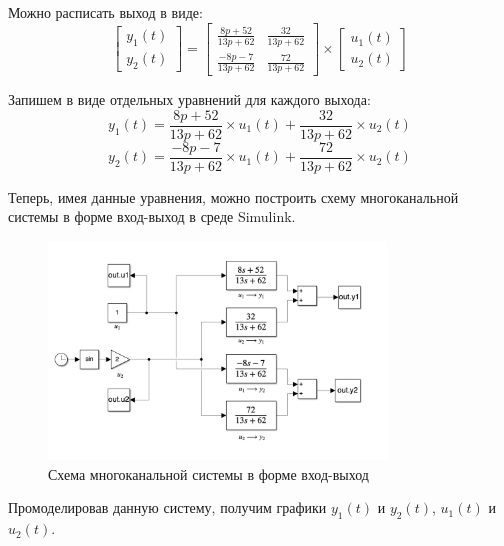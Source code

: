 Можно расписать выход в виде:
\begin{equation}
    \begin{bmatrix} 
        y_1(t)\\
        y_2(t)
    \end{bmatrix}
     = \begin{bmatrix}
        \frac{8p+52}{13p+62} & \frac{32}{13p+62} \\
        \frac{-8p-7}{13p+62} & \frac{72}{13p+62}
    \end{bmatrix} \times \begin{bmatrix}
        u_1(t) \\
        u_2(t)
    \end{bmatrix}
\end{equation}

Запишем в виде отдельных уравнений для каждого выхода:
\begin{equation}
    y_1(t) = \frac{8p+52}{13p+62} \times u_1(t) + \frac{32}{13p+62} \times u_2(t)
\end{equation}
\begin{equation}
    y_2(t) = \frac{-8p-7}{13p+62} \times u_1(t) + \frac{72}{13p+62} \times u_2(t)
\end{equation}

Теперь, имея данные уравнения, можно построить схему многоканальной системы в форме вход-выход в среде Simulink.

\begin{figure}
    \centering
    \includegraphics[width=0.8\textwidth]{media/system5.png}
    \caption{Схема многоканальной системы в форме вход-выход}
    \label{fig:MultyChannel}
\end{figure}

Промоделировав данную систему, получим графики $y_1(t)$ и $y_2(t)$, $u_1(t)$ и $u_2(t)$.

